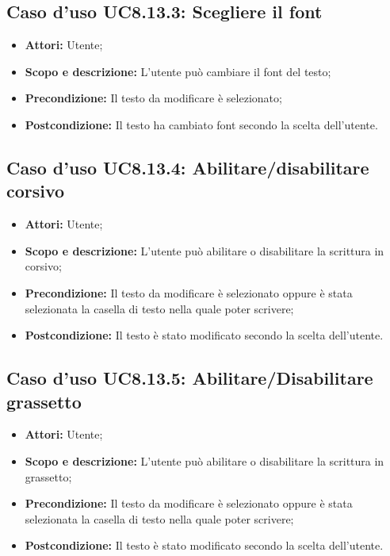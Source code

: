 \subsection{Caso d'uso UC8.13.3: Scegliere il font}
\begin{itemize}
	\item \textbf{Attori:} Utente;
	\item \textbf{Scopo e descrizione:} L'utente può cambiare il font del testo;
	\item \textbf{Precondizione:} Il testo da modificare è selezionato;
	\item \textbf{Postcondizione:} Il testo ha cambiato font secondo la scelta dell'utente.
\end{itemize}

\subsection{Caso d'uso UC8.13.4: Abilitare/disabilitare corsivo}
\begin{itemize}
	\item \textbf{Attori:} Utente;
	\item \textbf{Scopo e descrizione:} L'utente può abilitare o disabilitare la scrittura in corsivo;
	\item \textbf{Precondizione:} Il testo da modificare è selezionato oppure è stata selezionata la casella di testo nella quale poter scrivere;
	\item \textbf{Postcondizione:} Il testo è stato modificato secondo la scelta dell'utente.
\end{itemize}

\subsection{Caso d'uso UC8.13.5: Abilitare/Disabilitare grassetto}
\begin{itemize}
	\item \textbf{Attori:} Utente;
	\item \textbf{Scopo e descrizione:} L'utente può abilitare o disabilitare la scrittura in grassetto;
	\item \textbf{Precondizione:} Il testo da modificare è selezionato oppure è stata selezionata la casella di testo nella quale poter scrivere;
	\item \textbf{Postcondizione:} Il testo è stato modificato secondo la scelta dell'utente.
\end{itemize}

